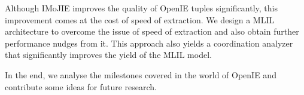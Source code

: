 Although IMoJIE improves the quality of OpenIE tuples significantly, this improvement comes at the cost of speed of extraction. We design a MLIL architecture to overcome the issue of speed of extraction and also obtain further performance nudges from it. This approach also yields a coordination analyzer that significantly improves the yield of the MLIL model.

In the end, we analyse the milestones covered in the world of OpenIE and contribute some ideas for future research.



